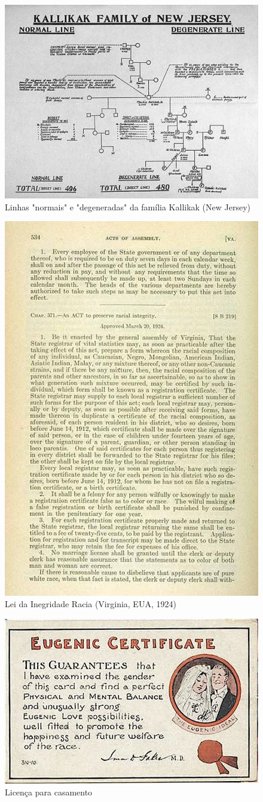 \documentclass[
]{book}
\theoremstyle{definition}
\theoremstyle{definition}
\theoremstyle{definition}
\theoremstyle{definition}
\theoremstyle{remark}
\begin{document}
\begin{figure}

{\centering \includegraphics[width=0.5\linewidth]{images/chart_Kallikak_pedigree2} 

}

\caption{Linhas "normais" e "degeneradas" da família Kallikak (New Jersey)}\label{fig:unnamed-chunk-17}
\end{figure}

\begin{figure}

{\centering \includegraphics[width=0.5\linewidth]{images/VA_racial_integrity_act2} 

}

\caption{Lei da Inegridade Racia (Virginia, EUA, 1924)}\label{fig:unnamed-chunk-18}
\end{figure}

\begin{figure}

{\centering \includegraphics[width=0.5\linewidth]{images/choosing_love_over_eugenics} 

}

\caption{Licença para casamento}\label{fig:unnamed-chunk-19}
\end{figure}
\end{document}
